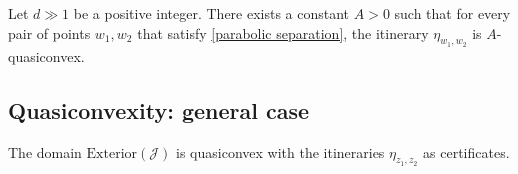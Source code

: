 \begin{corollary}
	Let $d \gg 1$ be a positive integer. There exists a constant $A>0$ such that for every pair of points $w_1,w_2$ that satisfy \cref{parabolic separation}, the itinerary $\eta_{w_1,w_2}$ is $A$-quasiconvex.
\end{corollary}

\subsection{Quasiconvexity: general case}

\begin{theorem} \label{quasiconvex-cauliflower} %
	\begin{enumerate}[label=\normalfont(\roman*)]
	The domain $\mathrm{Exterior}(\mathcal{J})$ is quasiconvex with the itineraries $\eta_{z_1,z_2}$ as certificates.
	\end{enumerate}
\end{theorem}

